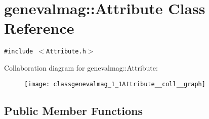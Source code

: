 \hypertarget{classgenevalmag_1_1Attribute}{
\section{genevalmag::Attribute Class Reference}
\label{classgenevalmag_1_1Attribute}
}
{\tt \#include $<$Attribute.h$>$}

Collaboration diagram for genevalmag::Attribute:\nopagebreak
\begin{figure}[H]
\begin{center}
\leavevmode
\texttt{[image: classgenevalmag\_1\_1Attribute\_\_coll\_\_graph]}
\end{center}
\end{figure}
\subsection*{Public Member Functions}
